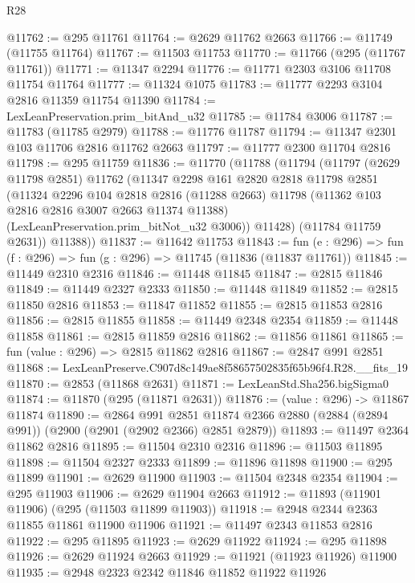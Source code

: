 \begin{lexlean}{R28}
\begin{coremodule}
@11762 := @295 @11761
@11764 := @2629 @11762 @2663
@11766 := @11749 (@11755 @11764)
@11767 := @11503 @11753
@11770 := @11766 (@295 (@11767 @11761))
@11771 := @11347 @2294
@11776 := @11771 @2303 @3106 @11708 @11754 @11764
@11777 := @11324 @1075
@11783 := @11777 @2293 @3104 @2816 @11359 @11754 @11390
@11784 := LexLeanPreservation.prim_bitAnd_u32
@11785 := @11784 @3006
@11787 := @11783 (@11785 @2979)
@11788 := @11776 @11787
@11794 := @11347 @2301 @103 @11706 @2816 @11762 @2663
@11797 := @11777 @2300 @11704 @2816
@11798 := @295 @11759
@11836 := @11770
    (@11788
      (@11794
        (@11797
          (@2629 @11798 @2851)
          @11762
          (@11347
            @2298
            @161
            @2820
            @2818
            @11798
            @2851
            (@11324
              @2296
              @104
              @2818
              @2816
              (@11288 @2663)
              @11798
              (@11362 @103 @2816 @2816 @3007 @2663 @11374 @11388)
              (LexLeanPreservation.prim_bitNot_u32 @3006))
            @11428)
          (@11784 @11759 @2631))
        @11388))
@11837 := @11642 @11753
@11843 := fun (e : @296) => fun (f : @296) => fun (g : @296) => @11745 (@11836 (@11837 @11761))
@11845 := @11449 @2310 @2316
@11846 := @11448 @11845
@11847 := @2815 @11846
@11849 := @11449 @2327 @2333
@11850 := @11448 @11849
@11852 := @2815 @11850 @2816
@11853 := @11847 @11852
@11855 := @2815 @11853 @2816
@11856 := @2815 @11855
@11858 := @11449 @2348 @2354
@11859 := @11448 @11858
@11861 := @2815 @11859 @2816
@11862 := @11856 @11861
@11865 := fun (value : @296) => @2815 @11862 @2816
@11867 := @2847 @991 @2851
@11868 := LexLeanPreserve.C907d8c149ae8f58657502835f65b96f4.R28.__fits_19
@11870 := @2853 (@11868 @2631)
@11871 := LexLeanStd.Sha256.bigSigma0
@11874 := @11870 (@295 (@11871 @2631))
@11876 := (value : @296) -> @11867 @11874
@11890 := @2864
    @991
    @2851
    @11874
    @2366
    @2880
    (@2884 (@2894 @991))
    (@2900 (@2901 (@2902 @2366) @2851 @2879))
@11893 := @11497 @2364 @11862 @2816
@11895 := @11504 @2310 @2316
@11896 := @11503 @11895
@11898 := @11504 @2327 @2333
@11899 := @11896 @11898
@11900 := @295 @11899
@11901 := @2629 @11900
@11903 := @11504 @2348 @2354
@11904 := @295 @11903
@11906 := @2629 @11904 @2663
@11912 := @11893 (@11901 @11906) (@295 (@11503 @11899 @11903))
@11918 := @2948 @2344 @2363 @11855 @11861 @11900 @11906
@11921 := @11497 @2343 @11853 @2816
@11922 := @295 @11895
@11923 := @2629 @11922
@11924 := @295 @11898
@11926 := @2629 @11924 @2663
@11929 := @11921 (@11923 @11926) @11900
@11935 := @2948 @2323 @2342 @11846 @11852 @11922 @11926

\end{coremodule}
\end{lexlean}
